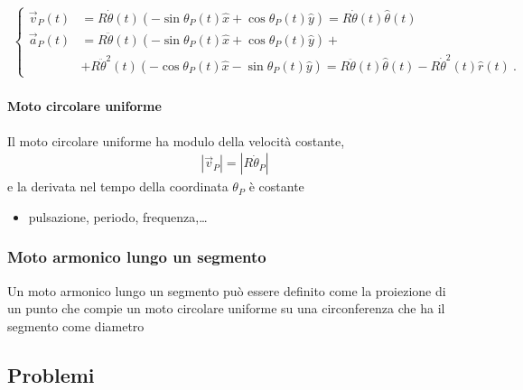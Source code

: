 \documentclass[letterpaper,10pt,italian]{jupyterBook}
\begin{document}
\begin{equation*}
\begin{split}\begin{cases}
  \vec{v}_P(t) & = R \dot{\theta}(t) \left( -\sin \theta_P(t) \hat{x} + \cos \theta_P(t) \hat{y} \right) = R \dot{\theta}(t) \hat{\theta}(t) \\
  \vec{a}_P(t) & = R \ddot{\theta}(t) \left( -\sin \theta_P(t) \hat{x} + \cos \theta_P(t) \hat{y} \right) + \\
               & + R \ddot{\theta}^2(t) \left( -\cos \theta_P(t) \hat{x} - \sin \theta_P(t) \hat{y} \right)     
                 = R \ddot{\theta}(t) \hat{\theta}(t) - R \dot{\theta}^2(t) \hat{r}(t) \ .
\end{cases}\end{split}
\end{equation*}

\paragraph{Moto circolare uniforme}
\label{\detokenize{ch/mechanics/kinematics-point:moto-circolare-uniforme}}
\sphinxAtStartPar
Il moto circolare uniforme ha modulo della velocità costante,
\begin{equation*}
\begin{split}|\vec{v}_P| = |R \dot \theta_P|\end{split}
\end{equation*}
\sphinxAtStartPar
e la derivata nel tempo della coordinata \(\theta_P\) è costante 
\begin{itemize}
\item {} 
\sphinxAtStartPar
{} pulsazione, periodo, frequenza,…

\end{itemize}


\subsubsection{Moto armonico lungo un segmento}
\label{\detokenize{ch/mechanics/kinematics-point:moto-armonico-lungo-un-segmento}}
\sphinxAtStartPar
Un moto armonico lungo un segmento può essere definito come la proiezione di un punto che compie un moto circolare uniforme su una circonferenza che ha il segmento come diametro 


\subsection{Problemi}
\label{\detokenize{ch/mechanics/kinematics-point:problemi}}
\sphinxstepscope
\end{document}

